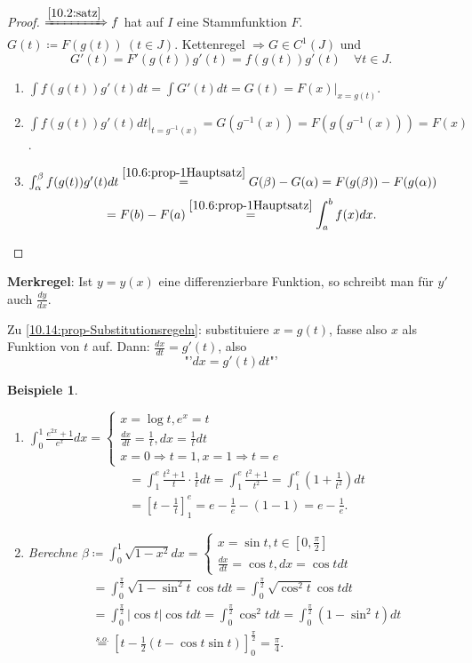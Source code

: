 \documentclass[titlepage,ngerman,a4paper,headsepline]{scrartcl}
\theoremstyle{named}
\theoremstyle{dotless}
\newtheorem*{beispiele}{Beispiele}
\begin{document}
\begin{proof}
	$\xRightarrow[]{\ref{10.2:satz}} f$ hat auf $I$ eine Stammfunktion $F$. $G(t) \coloneqq F(g(t)) ~ (t \in J)$. Kettenregel $\Rightarrow G \in C^{1}(J)$ und
	$$ G'(t) = F'(g(t)) g'(t) = f(g(t)) g'(t) \quad \forall t \in J. $$
	\begin{enumerate}
		\item $\int f(g(t)) g'(t) dt = \int G'(t) dt = G(t) = F(x) \Big|_{x=g(t)}$.
		\item $\int f(g(t)) g'(t) dt\Big|_{t = g^{-1}(x)} = G(g^{-1}(x)) = F(g(g^{-1}(x))) = F(x)$.
		\item $\int_{\alpha}^{\beta} f(g(t)) g'(t) dt \overset{\ref{10.6:prop-1Hauptsatz}}{=} G(\beta) - G(\alpha) = F(g(\beta)) - F(g(\alpha))$ 
		$$ = F(b) - F(a) \overset{\ref{10.6:prop-1Hauptsatz}}{=} \int_{a}^{b} f(x) dx. $$ 
	\end{enumerate}
\end{proof}


\textbf{Merkregel}:  Ist $y = y(x)$ eine differenzierbare Funktion, so schreibt man für $y'$ auch $\frac{dy}{dx}$.

Zu \ref{10.14:prop-Substitutionsregeln}: substituiere $x = g(t)$, fasse also $x$ als Funktion von $t$ auf. Dann: $\frac{dx}{dt} = g'(t)$, also
	$$ \text{"'} dx = g'(t) dt \text{"'} $$


\begin{beispiele} ~\
	\begin{enumerate}
		\item $\int_{0}^{1} \frac{e^{2x} + 1}{e^{x}} dx = \begin{cases} x = \log t, e^{x} = t \\ \frac{dx}{dt} = \frac{1}{t}, dx = \frac{1}{t} dt \\ x = 0 \Rightarrow t = 1, x = 1 \Rightarrow t = e \end{cases} $
			\begin{align*}
				& = \int_{1}^{e} \frac{t^{2} + 1}{t} \cdot \frac{1}{t} dt = \int_{1}^{e} \frac{t^{2} + 1}{t^{2}} = \int_{1}^{e} (1 + \frac{1}{t^{2}}) dt \\
				& = \left[ t - \frac{1}{t} \right]_{1}^{e} = e - \frac{1}{e} - (1 - 1) = e - \frac{
				1}{e}.
			\end{align*}
		\item Berechne $\beta \coloneqq \int_{0}^{1} \sqrt{1 - x^{2}} dx = \begin{cases} x = \sin t, t \in [0, \frac{\pi}{2}] \\ \frac{dx}{dt} = \cos t, dx = \cos t dt \end{cases}$
			\begin{align*}
				& = \int_{0}^{\frac{\pi}{2}} \sqrt{1 - \sin^{2}t} \cos t dt = \int_{0}^{\frac{\pi}{2}} \sqrt{\cos^{2} t} \cos t dt \\
				& = \int_{0}^{\frac{\pi}{2}} |\cos t| \cos t dt = \int_{0}^{\frac{\pi}{2}} \cos^{2} t dt = \int_{0}^{\frac{\pi}{2}} (1 - \sin^{2} t) dt \\
				& \overset{s.o.}{=} \left[ t - \frac{1}{2} (t - \cos t \sin t) \right]_{0}^{\frac{\pi}{2}} = \frac{\pi}{4}.
			\end{align*}
	\end{enumerate}
\end{beispiele}
\end{document}
